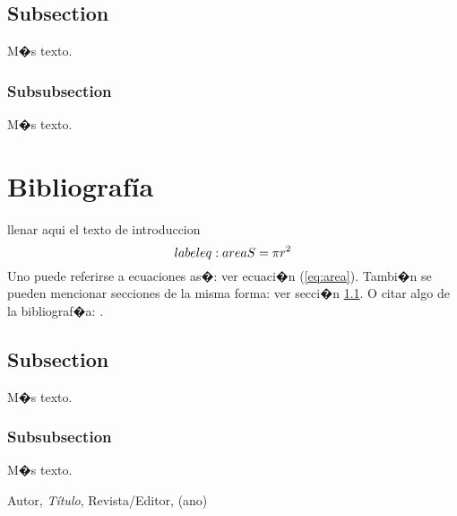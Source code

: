 \documentclass{article}
\theoremstyle{definition}
\theoremstyle{remark}
\begin{document}
\subsection{Subsection}\label{sec:nada}

M�s texto.

\subsubsection{Subsubsection}\label{sec:nada2}

M�s texto.





\section{Bibliograf\'ia}

llenar aqui el texto de introduccion
\begin{equation}\\label{eq:area}
  S = \pi r^2
\end{equation}
Uno puede referirse a ecuaciones as�: ver ecuaci�n (\ref{eq:area}).
Tambi�n se pueden mencionar secciones de la misma forma: ver secci�n
\ref{sec:nada}. O citar algo de la bibliograf�a: \cite{Cd94}.

\subsection{Subsection}\label{sec:nada}

M�s texto.

\subsubsection{Subsubsection}\label{sec:nada2}

M�s texto.





\begin{thebibliography}{99}

 Autor, \emph{T\'itulo}, Revista/Editor, (ano)

\end{thebibliography}
\end{document}

